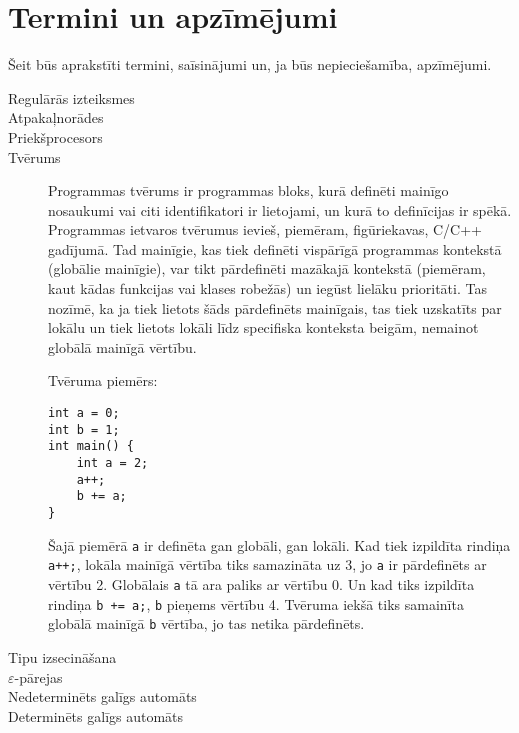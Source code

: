 \section*{Termini un apzīmējumi}
Šeit būs aprakstīti termini, saīsinājumi un, ja būs nepieciešamība, apzīmējumi.

\begin{description}
\item[Regulārās izteiksmes]
\item[Atpakaļnorādes]
\item[Priekšprocesors]
\item[Tvērums]
Programmas tvērums ir programmas bloks, kurā definēti mainīgo nosaukumi vai citi identifikatori ir lietojami, un kurā to definīcijas ir spēkā. Programmas ietvaros tvērumus ievieš, piemēram, figūriekavas, C/C++ gadījumā. Tad mainīgie, kas tiek definēti vispārīgā programmas kontekstā (globālie mainīgie), var tikt pārdefinēti mazākajā kontekstā (piemēram, kaut kādas funkcijas vai klases robežās) un iegūst lielāku prioritāti. Tas nozīmē, ka ja tiek lietots šāds pārdefinēts mainīgais, tas tiek uzskatīts par lokālu un tiek lietots lokāli līdz specifiska konteksta beigām, nemainot globālā mainīgā vērtību.

Tvēruma piemērs:
\begin{verbatim}
int a = 0;
int b = 1;
int main() {
    int a = 2;
    a++;
    b += a;
}
\end{verbatim}
Šajā piemērā \verb|a| ir definēta gan globāli, gan lokāli. Kad tiek izpildīta rindiņa \verb|a++;|, lokāla mainīgā vērtība tiks samazināta uz 3, jo \verb|a| ir pārdefinēts ar vērtību 2. Globālais \verb|a| tā ara paliks ar vērtību 0. Un kad tiks izpildīta rindiņa \verb|b += a;|, \verb|b| pieņems vērtību 4. Tvēruma iekšā tiks samainīta globālā mainīgā \verb|b| vērtība, jo tas netika pārdefinēts.

\item[Tipu izsecināšana]
\item[$\varepsilon$-pārejas]
\item[Nedeterminēts galīgs automāts]
\item[Determinēts galīgs automāts]
\end{description}